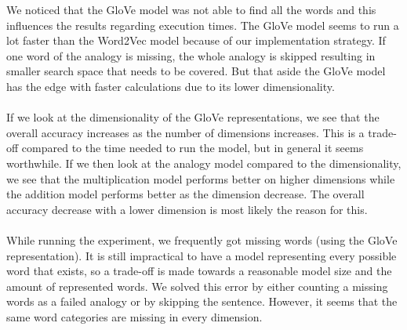 We noticed that the GloVe model was not able to find all the words and this influences the results regarding execution times. The GloVe model seems to run a lot faster than the Word2Vec model because of our implementation strategy. If one word of the analogy is missing, the whole analogy is skipped resulting in smaller search space that needs to be covered. But that aside the GloVe model has the edge with faster calculations due to its lower dimensionality.
\paragraph{}

If we look at the dimensionality of the GloVe representations, we see that the overall accuracy increases as the number of dimensions increases. This is a trade-off compared to the time needed to run the model, but in general it seems worthwhile. 
If we then look at the analogy model compared to the dimensionality, we see that the multiplication model performs better on higher dimensions while the addition model performs better as the dimension decrease. The overall accuracy decrease with a lower dimension is most likely the reason for this.
\paragraph{}

While running the experiment, we frequently got missing words (using the GloVe representation). It is still impractical to have a model representing every possible word that exists, so a trade-off is made towards a reasonable model size and the amount of represented words. We solved this error by either counting a missing words as a failed analogy or by skipping the sentence. However, it seems that the same word categories are missing in every dimension.

